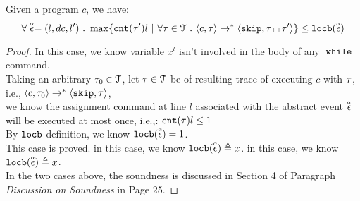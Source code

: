 \begin{lem}
  \label{lem:local_bound_sound}
Given a program ${c}$, we have:
%
\[
\forall \absevent = (l, dc, l') \st 
\max \left\{ \vcounter(\vtrace') l ~ \middle\vert~
\forall \vtrace \in \mathcal{T} \st \config{{c}, \trace} \to^{*} \config{\eskip, \trace\tracecat\vtrace'} \right\} 
\leq 
\locbound(\absevent)
\]
\end{lem}
\begin{proof}
  In this case, we know variable $x^l$ isn't involved in the body of any $\;\mathtt{while}\;$ command. 
  \\
  Taking an arbitrary $\mathtt{\tau}_0 \in \mathcal{T}$, 
  let $\mathtt{\tau} \in \mathcal{T}$ be of resulting trace of executing $c$ with $\mathtt{\tau}$, 
  i.e., $\langle {c}, \mathtt{\tau}_0 \rangle \to^{*} \langle \mathtt{skip}, \mathtt{\tau} \rangle$,
  \\
  we know the
  assignment command at line $l$ associated with the abstract event $\stackrel{\scriptscriptstyle{\alpha}}{\mathtt{\epsilon}{}}$ will be executed at most once, i.e.,:
  $\mathtt{cnt}(\mathtt{\tau}) l \leq 1$
  \\
  By $\mathtt{locb}$ definition, we know $\mathtt{locb}(\stackrel{\scriptscriptstyle{\alpha}}{\mathtt{\epsilon}{}}) = 1$.
  \\
  This case is proved.
    in this case, we know $\mathtt{locb}(\stackrel{\scriptscriptstyle{\alpha}}{\mathtt{\epsilon}{}}) \triangleq x$.
    in this case, we know $\mathtt{locb}(\stackrel{\scriptscriptstyle{\alpha}}{\mathtt{\epsilon}{}}) \triangleq x$.
  \\
  In the two cases above, the soundness is discussed in \cite{sinn2017complexity} Section 4 of Paragraph \emph{Discussion on Soundness} in Page 25.
\end{proof}